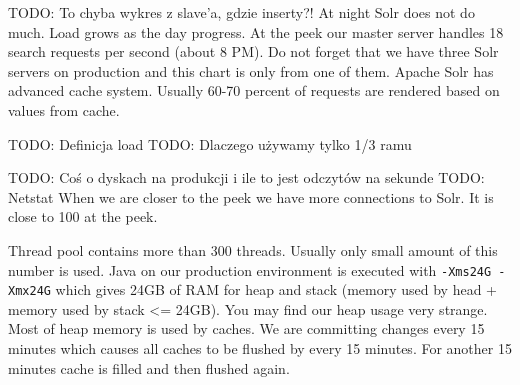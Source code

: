 \documentclass[10pt,a4paper]{article}
\newcommand{\todo}[1]{\noindent\colorbox{myRed}{TODO: #1}}
\begin{document}
\todo{To chyba wykres z slave'a, gdzie inserty?!}
At night Solr does not do much. Load grows as the day progress. At the peek our master server handles 18 search requests per second (about 8 PM). Do not forget that we have three Solr servers on production and this chart is only from one of them. Apache Solr has advanced cache system. Usually 60-70 percent of requests are rendered based on values from cache.

\todo{Definicja load} 
\todo{Dlaczego używamy tylko 1/3 ramu}



\todo{Coś o dyskach na produkcji i ile to jest odczytów na sekunde}
\todo{Netstat}
When we are closer to the peek we have more connections to Solr. It is close to 100 at the peek. 

Thread pool contains more than 300 threads. Usually only small amount of this number is used. Java on our production environment is executed with \verb|-Xms24G -Xmx24G| which gives 24GB of RAM for heap and stack (memory used by head + memory used by stack <= 24GB). You may find our heap usage very strange. Most of heap memory is used by caches. We are committing changes every 15 minutes which causes all caches to be flushed by every 15 minutes. For another 15 minutes cache is filled and then flushed again.  




\end{document}
